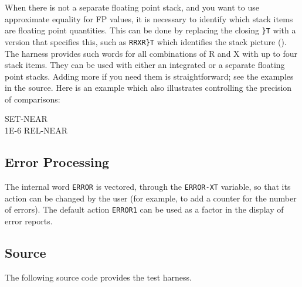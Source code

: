 When there is not a separate floating point stack, and you want to use
approximate equality for FP values, it is necessary to identify which
stack items are floating point quantities.  This can be done by
replacing the closing \texttt{\}T} with a version that specifies
this, such as \texttt{RRXR\}T} which identifies the stack picture
\linebreak ().  The harness provides such words for all
combinations of R and X with up to four stack items.  They can be
used with either an integrated or a separate floating point stacks.
Adding more if you need them is straightforward; see the examples in
the source.  Here is an example which also illustrates controlling
the precision of comparisons:

\begin{tt}
SET-NEAR \\
1E-6 REL-NEAR  \\
\end{tt}

\subsection{Error Processing}

The internal word \texttt{ERROR} is vectored, through the
\texttt{ERROR-XT} variable, so that its action can be changed by
the user (for example, to add a counter for the number of errors).
The default action \texttt{ERROR1} can be used as a factor in the
display of error reports.

\subsection{Source}

The following source code provides the test harness.


